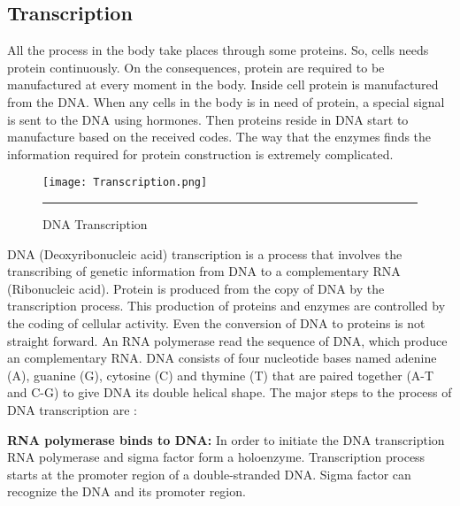 \subsection{Transcription}
All the process in the body take places through some proteins. So, cells needs protein continuously. 
On the consequences, protein are required to be manufactured at every moment in the body. Inside cell 
protein is manufactured from the DNA. When any cells in the body is in need of protein, a special signal 
is sent to the DNA using hormones. Then proteins reside in DNA start to manufacture based on the 
received codes. The way that the enzymes finds the information required for protein construction is 
extremely complicated.

\begin{figure}%
	\centering
		 \texttt{[image: Transcription.png]} 
		\rule{35em}{0.5pt}
	\caption{DNA Transcription}
	\label{fig:transcription}
\end{figure}

DNA (Deoxyribonucleic acid) transcription is a process that involves the transcribing of 
genetic information from DNA to a complementary RNA (Ribonucleic acid). Protein is produced 
from the copy of DNA by the transcription process. This production of proteins and enzymes 
are controlled by the coding of cellular activity. Even the conversion of DNA to proteins 
is not straight forward. An RNA polymerase read the sequence of DNA, which produce an 
complementary RNA. DNA consists of four nucleotide bases named adenine (A), guanine (G), 
cytosine (C) and thymine (T) that are paired together (A-T and C-G) to give DNA its double 
helical shape. The major steps to the process of DNA transcription are :

\textbf{RNA polymerase binds to DNA:} In order to initiate the DNA transcription RNA polymerase and 
sigma factor form a holoenzyme. Transcription process starts at the promoter region of a 
double-stranded DNA. Sigma factor can recognize the DNA and its promoter region. 

